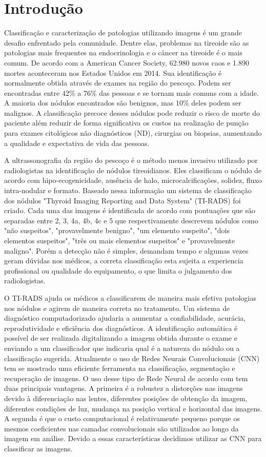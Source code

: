 \documentclass[12pt]{article}
\begin{document}
\section{Introdução}
Classificação e caracterização de patologias utilizando imagens é um grande desafio enfrentado pela comunidade. Dentre elas, problemas na tireoide são as patologias mais frequentes na endocrinologia e o câncer na tireoide é o mais comum. De acordo com a American Cancer Society, 62.980 novos caos e 1.890 mortes aconteceram nos Estados Unidos em 2014\cite{LinaP}. Sua identificação é normalmente obtida através de exames na região do pescoço. Podem ser encontradas entre 42\% a 76\% das pessoas e se tornam mais comuns com a idade\cite{SinghOspinal6670}. A maioria dos nódulos encontrados são benignos, mas 10\% deles podem ser malignos\cite{GuthS}. A classificação precoce desses nódulos pode reduzir o risco de morte do paciente além reduzir de forma significativa os custos na realização de punção para exames citológicos não diagnósticos (ND), cirurgias ou biopsias, aumentando a qualidade e expectativa de vida das pessoas.

A ultrassonografia da região do pescoço é o método menos invasivo utilizado por radiologistas na identificação de nódulos tireoidianos. Eles classificam o nódulo de acordo com hipo-ecogenicidade, ausência de halo, microcalcificações, solidez, fluxo intra-nodular e formato\cite{DianaGaitini}. Baseado nessa informação um sistema de classificação dos nódulos "Thyroid Imaging Reporting and Data System" (TI-RADS) foi criado. Cada uma das imagens é identificada de acordo com pontuações que são separadas entre 2, 3, 4a, 4b, 4c e 5 que respectivamente descrevem nódulos como "não suspeitos", "provavelmente benigno", "um elemento suspeito", "dois elementos suspeitos", "três ou mais elementos suspeitos" e "provavelmente maligno"\cite{KwakJY}. Porém a detecção não é simples, demandam tempo e algumas vezes geram dúvidas nos médicos, a correta classificação esta sujeita a experiencia profissional ou qualidade do equipamento, o que limita o julgamento dos radiologistas\cite{LingamRK}.

O TI-RADS ajuda os médicos a classificarem de maneira mais efetiva patologias nos nódulos e agirem de maneira correta no tratamento. Um sistema de diagnóstico computadorizado ajudaria a aumentar a confiabilidade, acurácia, reprodutividade e eficiência dos diagnósticos. A identificação automática é possível de ser realizada digitalizando a imagem obtida durante o exame e enviando a um classificador que indicaria qual é a natureza do nódulo ou a classificação sugerida. Atualmente o uso de Redes Neurais Convolucionais (CNN) tem se mostrado uma eficiente ferramenta na classificação, segmentação e recuperação de imagens. O uso desse tipo de Rede Neural de acordo com \cite{HijaziS} tem duas principais vantagens. A primeira é a robustez a distorções nas imagens devido à diferenciação nas lentes, diferentes posições de obtenção da imagem, diferentes condições de luz, mudança na posição vertical e horizontal das imagens. A segunda é que o custo computacional é relativamente pequeno porque os mesmos coeficientes nas camadas convolucionais são utilizados ao longo da imagem em análise. Devido a essas características decidimos utilizar as CNN para classificar as imagens.
\end{document}
